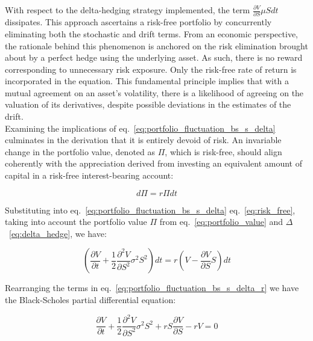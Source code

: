     With respect to the delta-hedging strategy implemented, the term $\frac{\partial V}{\partial S} \mu S dt$ dissipates.
    This approach ascertains a risk-free portfolio by concurrently eliminating both the stochastic and drift terms.
    From an economic perspective, the rationale behind this phenomenon is anchored on the risk elimination
    brought about by a perfect hedge using the underlying asset.
    As such, there is no reward corresponding to unnecessary risk exposure.
    Only the risk-free rate of return is incorporated in the equation.
    This fundamental principle implies that with a mutual agreement on an asset's volatility,
    there is a likelihood of agreeing on the valuation of its derivatives,
    despite possible deviations in the estimates of the drift.  \\

    Examining the implications of eq.~\ref{eq:portfolio_fluctuation_bs_s_delta} culminates in the derivation that
    it is entirely devoid of risk.
    An invariable change in the portfolio value, denoted as $\Pi$, which is risk-free, should align coherently with
    the appreciation derived from investing an equivalent amount of capital in a risk-free interest-bearing account:

    \begin{equation}
        d\Pi = r \Pi dt
        \label{eq:risk_free}
    \end{equation}

    Substituting into eq.~\ref{eq:portfolio_fluctuation_bs_s_delta} eq.~\ref{eq:risk_free}, taking into account the
    portfolio value $\Pi$ from eq.~\ref{eq:portfolio_value} and $\Delta$~\ref{eq:delta_hedge}, we have:

    \begin{equation}
        \left(
            \frac{\partial V}{\partial t}
            + \frac{1}{2} \frac{\partial^2 V}{\partial S^2} \sigma^2 S^2
        \right) dt
        = r \left( V - \frac{\partial V}{\partial S} S \right) dt
        \label{eq:portfolio_fluctuation_bs_s_delta_r}
    \end{equation}

    Rearranging the terms in eq.~\ref{eq:portfolio_fluctuation_bs_s_delta_r} we have the Black-Scholes partial
    differential equation:

    \begin{equation}
        \frac{\partial V}{\partial t}
        + \frac{1}{2} \frac{\partial^2 V}{\partial S^2} \sigma^2 S^2
        + r S \frac{\partial V}{\partial S}
        - r V = 0
        \label{eq:black_scholes}
    \end{equation}

